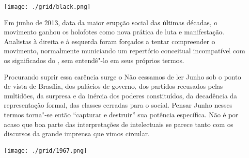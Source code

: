 \begin{center}
\hspace*{.5cm}\texttt{[image: ./grid/black.png]}
\end{center}

\hspace*{-7cm}\hrulefill\hspace*{-7cm}

\medskip

\noindent{}Em junho de 2013, data da maior erupção social das últimas décadas, o movimento {} ganhou os holofotes como nova prática de luta e manifestação. Analistas à direita e à esquerda foram forçados a tentar compreender o movimento, normalmente municiando um repertório conceitual incompatível com os significados do {}, sem entendê"-lo em seus próprios termos.

Procurando suprir essa carência surge o  Não cessamos de ler Junho sob o ponto de vista de Brasília, dos palácios de governo, dos partidos recusados pelas multidões, da surpresa e da inércia dos poderes constituídos, da decadência da representação formal, das classes cerradas para o social. Pensar Junho nesses termos torna"-se então “capturar e destruir” sua potência específica. Não é por acaso que boa parte das interpretações de intelectuais se parece tanto com os discursos da grande imprensa que vimos circular.


\vfill

\hspace*{-.4cm}\begin{minipage}[c]{.5\linewidth}
\small{
{}}
\end{minipage}


\pagebreak %


\begin{center}
\hspace*{-3.6cm}
\hspace*{3.1cm}\texttt{[image: ./grid/1967.png]}
\end{center}

